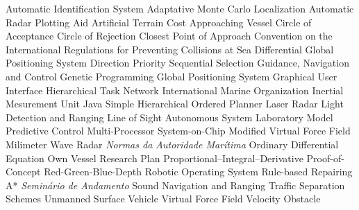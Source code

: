 \begin{acronym}
      {Automatic Identification System}
     {Adaptative Monte Carlo Localization}
     {Automatic Radar Plotting Aid}
      {Artificial Terrain Cost}
       {Approaching Vessel}
      {Circle of Acceptance}
      {Circle of Rejection}
      {Closest Point of Approach}
  {Convention on the International Regulations for Preventing Collisions at Sea}
     {Differential Global Positioning System}
     {Direction Priority Sequential Selection}
      {Guidance, Navigation and Control}
       {Genetic Programming}
      {Global Positioning System}
      {Graphical User Interface}
      {Hierarchical Task Network}
      {International Marine Organization}
      {Inertial Mesurement Unit}
    {Java Simple Hierarchical Ordered Planner}
    {Laser Radar}
    {Light Detection and Ranging}
      {Line of Sight}
      {Autonomous System Laboratory}
      {Model Predictive Control}
      {Multi-Processor System-on-Chip}
     {Modified Virtual Force Field}
      {Milimeter Wave Radar}
   {\textit{Normas da Autoridade Marítima}}
      {Ordinary Differential Equation}
       {Own Vessel}
      {Research Plan}
      {Proportional–Integral–Derivative}
      {Proof-of-Concept}
     {Red-Green-Blue-Depth}
      {Robotic Operating System}
    {Rule-based Repairing A*}
       {\textit{Seminário de Andamento}}
    {Sound Navigation and Ranging}
      {Traffic Separation Schemes}
      {Unmanned Surface Vehicle}
      {Virtual Force Field}
       {Velocity Obstacle}
\end{acronym}